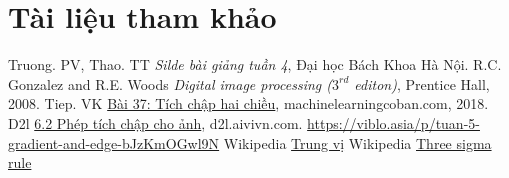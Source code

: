 \documentclass{article}
\begin{document}
    \newpage
    \section{Tài liệu tham khảo}
    \begin{thebibliography}{9}
    Truong. PV, Thao. TT \emph{Silde bài giảng tuần 4}, Đại học Bách Khoa Hà Nội.
    R.C. Gonzalez and R.E. Woods \emph{Digital image processing ($3^{rd}$ editon)}, Prentice Hall, 2008.
    Tiep. VK \href{https://machinelearningcoban.com/2018/10/03/conv2d}{Bài 37: Tích chập hai chiều}, machinelearningcoban.com, 2018.
    D2l \href{https://d2l.aivivn.com/chapter_convolutional-neural-networks/conv-layer_vn.html}{6.2 Phép tích chập cho ảnh}, d2l.aivivn.com. 
    \url{https://viblo.asia/p/tuan-5-gradient-and-edge-bJzKmOGwl9N}
    Wikipedia \href{https://vi.wikipedia.org/wiki/S%E1%BB%91_trung_v%E1%BB%8B}{Trung vị}
    Wikipedia \href{https://en.wikipedia.org/wiki/68%E2%80%9395%E2%80%9399.7_rule}{Three sigma rule}
    \end{thebibliography}
\end{document}
